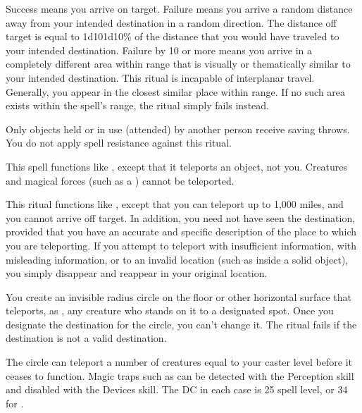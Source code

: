 Success means you arrive on target. Failure means you arrive a random distance away from your intended destination in a random direction. The distance off target is equal to 1d10\mult1d10\% of the distance that you would have traveled to your intended destination. Failure by 10 or more means you arrive in a completely different area within range that is visually or thematically similar to your intended destination.
\spellnotes This ritual is incapable of interplanar travel. Generally, you appear in the closest similar place within range. If no such area exists within the spell's range, the ritual simply fails instead.

Only objects held or in use (attended) by another person receive saving throws. You do not apply spell resistance against this ritual. 

\spelleffect This spell functions like , except that it teleports an object, not you. Creatures and magical forces (such as a ) cannot be teleported.

\spelleffect This ritual functions like , except that you can teleport up to 1,000 miles, and you cannot arrive off target. In addition, you need not have seen the destination, provided that you have an accurate and specific description of the place to which you are teleporting. If you attempt to teleport with insufficient information, with misleading information, or to an invalid location (such as inside a solid object), you simply disappear and reappear in your original location.

\spelleffect You create an invisible \areasmall radius circle on the floor or other horizontal surface that teleports, as , any creature who stands on it to a designated spot. Once you designate the destination for the circle, you can't change it. The ritual fails if the destination is not a valid destination.
\par The circle can teleport a number of creatures equal to your caster level before it ceases to function.
\spellnotes Magic traps such as  can be detected with the Perception skill and disabled with the Devices skill. The DC in each case is 25 \add spell level, or 34 for .

